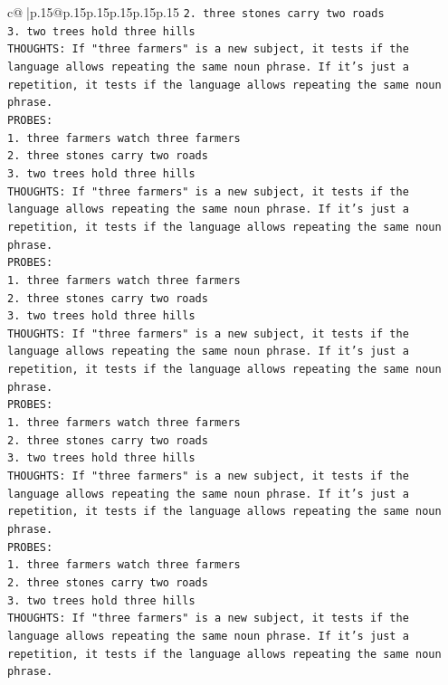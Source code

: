 \documentclass{article}
\begin{document}
{\begin{supertabular}{c@{$\;$}|p{.15\linewidth}@{}p{.15\linewidth}p{.15\linewidth}p{.15\linewidth}p{.15\linewidth}p{.15\linewidth}}
{{{\texttt{2. three stones carry two roads} \\
\texttt{3. two trees hold three hills} \\
\texttt{THOUGHTS: If "three farmers" is a new subject, it tests if the language allows repeating the same noun phrase. If it's just a repetition, it tests if the language allows repeating the same noun phrase.} \\
\texttt{PROBES:} \\
\texttt{1. three farmers watch three farmers} \\
\texttt{2. three stones carry two roads} \\
\texttt{3. two trees hold three hills} \\
\texttt{THOUGHTS: If "three farmers" is a new subject, it tests if the language allows repeating the same noun phrase. If it's just a repetition, it tests if the language allows repeating the same noun phrase.} \\
\texttt{PROBES:} \\
\texttt{1. three farmers watch three farmers} \\
\texttt{2. three stones carry two roads} \\
\texttt{3. two trees hold three hills} \\
\texttt{THOUGHTS: If "three farmers" is a new subject, it tests if the language allows repeating the same noun phrase. If it's just a repetition, it tests if the language allows repeating the same noun phrase.} \\
\texttt{PROBES:} \\
\texttt{1. three farmers watch three farmers} \\
\texttt{2. three stones carry two roads} \\
\texttt{3. two trees hold three hills} \\
\texttt{THOUGHTS: If "three farmers" is a new subject, it tests if the language allows repeating the same noun phrase. If it's just a repetition, it tests if the language allows repeating the same noun phrase.} \\
\texttt{PROBES:} \\
\texttt{1. three farmers watch three farmers} \\
\texttt{2. three stones carry two roads} \\
\texttt{3. two trees hold three hills} \\
\texttt{THOUGHTS: If "three farmers" is a new subject, it tests if the language allows repeating the same noun phrase. If it's just a repetition, it tests if the language allows repeating the same noun phrase.} \\
}}}
\end{supertabular}}
\end{document}
